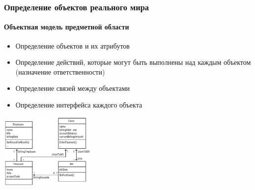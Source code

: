 \documentclass[xetex,mathserif,serif]{beamer}
\begin{document}
    \begin{frame}
        \frametitle{Определение объектов реального мира}
        \framesubtitle{Объектная модель предметной области}
        \begin{itemize}
            \item Определение объектов и их атрибутов
            \item Определение действий, которые могут быть выполнены над каждым объектом (назначение ответственности)
            \item Определение связей между объектами
            \item Определение интерфейса каждого объекта
        \end{itemize}
        \begin{center}
            \includegraphics[width=0.35\textwidth]{billDomainModel.png}
        \end{center}
    \end{frame}
\end{document}

